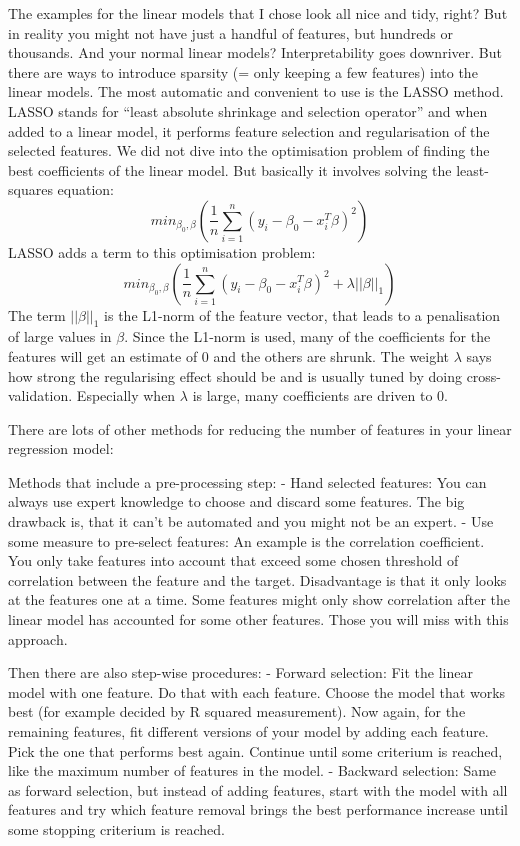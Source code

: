 \documentclass[12pt,]{krantz}
\theoremstyle{definition}
\theoremstyle{definition}
\theoremstyle{definition}
\theoremstyle{remark}
\begin{document}
The examples for the linear models that I chose look all nice and tidy,
right? But in reality you might not have just a handful of features, but
hundreds or thousands. And your normal linear models? Interpretability
goes downriver. But there are ways to introduce sparsity (= only keeping
a few features) into the linear models. The most automatic and
convenient to use is the LASSO method. LASSO stands for ``least absolute
shrinkage and selection operator'' and when added to a linear model, it
performs feature selection and regularisation of the selected features.
We did not dive into the optimisation problem of finding the best
coefficients of the linear model. But basically it involves solving the
least-squares equation:
\[ min_{\beta_0,\beta} \left( \frac{1}{n} \sum_{i=1}^n (y_i - \beta_0 - x_i^T \beta)^2\right)\]
LASSO adds a term to this optimisation problem:
\[ min_{\beta_0,\beta} \left( \frac{1}{n} \sum_{i=1}^n (y_i - \beta_0 - x_i^T \beta)^2 + \lambda ||\beta||_1\right)\]
The term \(||\beta||_1\) is the L1-norm of the feature vector, that
leads to a penalisation of large values in \(\beta\). Since the L1-norm
is used, many of the coefficients for the features will get an estimate
of 0 and the others are shrunk. The weight \(\lambda\) says how strong
the regularising effect should be and is usually tuned by doing
cross-validation. Especially when \(\lambda\) is large, many
coefficients are driven to 0.

There are lots of other methods for reducing the number of features in
your linear regression model:

Methods that include a pre-processing step: - Hand selected features:
You can always use expert knowledge to choose and discard some features.
The big drawback is, that it can't be automated and you might not be an
expert. - Use some measure to pre-select features: An example is the
correlation coefficient. You only take features into account that exceed
some chosen threshold of correlation between the feature and the target.
Disadvantage is that it only looks at the features one at a time. Some
features might only show correlation after the linear model has
accounted for some other features. Those you will miss with this
approach.

Then there are also step-wise procedures: - Forward selection: Fit the
linear model with one feature. Do that with each feature. Choose the
model that works best (for example decided by R squared measurement).
Now again, for the remaining features, fit different versions of your
model by adding each feature. Pick the one that performs best again.
Continue until some criterium is reached, like the maximum number of
features in the model. - Backward selection: Same as forward selection,
but instead of adding features, start with the model with all features
and try which feature removal brings the best performance increase until
some stopping criterium is reached.
\end{document}
